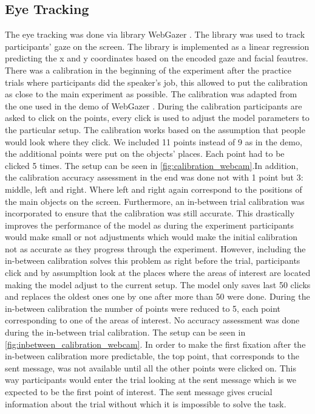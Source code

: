 \subsection{Eye Tracking}
\label{sec:data:eyetr}
The eye tracking was done via library WebGazer \cite{webgazer}. The library was used to track participants' gaze on the screen. The library is implemented as a linear regression predicting the x and y coordinates based on the encoded gaze and facial feautres. There was a calibration in the beginning of the experiment after the practice trials where participants did the speaker's job, this allowed to put the calibration as close to the main experiment as possible. The calibration was adapted from the one used in the demo of WebGazer \cite{webgazer}. During the calibration participants are asked to click on the points, every click is used to adjust the model parameters to the particular setup. The calibration works based on the assumption that people would look where they click. We included 11 points instead of 9 as in the demo, the additional points were put on the objects' places. Each point had to be clicked 5 times. The setup can be seen in \autoref{fig:calibration_webcam}.In addition, the calibration accuracy assessment in the end was done not with 1 point but 3: middle, left and right. Where left and right again correspond to the positions of the main objects on the screen. Furthermore, an in-between trial calibration was incorporated to ensure that the calibration was still accurate. This drastically improves the performance of the model as during the experiment participants would make small or not adjustments which would make the initial calibration not as accurate as they progress through the experiment. However, including the in-between calibration solves this problem as right before the trial, participants click and by assumpltion look at the places where the areas of interest are located making the model adjust to the current setup. The model only saves last 50 clicks and replaces the oldest ones one by one after more than 50 were done. During the in-between calibration the number of points were reduced to 5, each point corresponding to one of the areas of interest. No accuracy assessment was done during the in-between trial calibration. The setup can be seen in \autoref{fig:inbetween_calibration_webcam}. In order to make the first fixation after the in-between calibration more predictable, the top point, that corresponds to the sent message, was not available until all the other points were clicked on. This way participants would enter the trial looking at the sent message which is we expected to be the first point of interest. The sent message gives crucial information about the trial without which it is impossible to solve the task.

